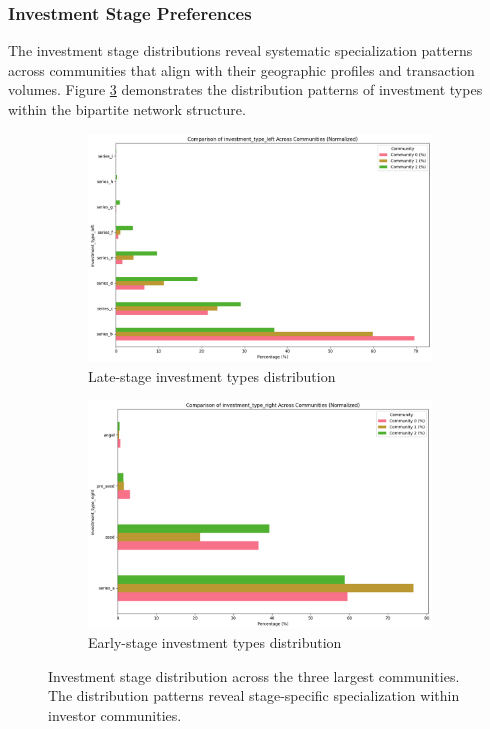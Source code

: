 \subsubsection{Investment Stage Preferences}

The investment stage distributions reveal systematic specialization patterns across communities that align with their geographic profiles and transaction volumes. Figure \ref{fig:investment_stage_distribution} demonstrates the distribution patterns of investment types within the bipartite network structure.

\begin{figure}[htbp]
\centering
\begin{subfigure}{0.48\textwidth}
    \centering
    \includegraphics[width=\textwidth]{./assets/late-investment-types-distribution.png}
    \caption{Late-stage investment types distribution}
    \label{fig:late_stage_types}
\end{subfigure}
\hfill
\begin{subfigure}{0.48\textwidth}
    \centering
    \includegraphics[width=\textwidth]{./assets/early-investment-types-distribution.png}
    \caption{Early-stage investment types distribution}
    \label{fig:early_stage_types}
\end{subfigure}
\caption{Investment stage distribution across the three largest communities. The distribution patterns reveal stage-specific specialization within investor communities.}
\label{fig:investment_stage_distribution}
\end{figure}



